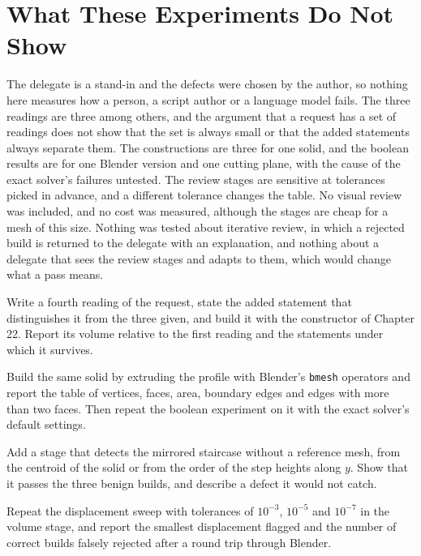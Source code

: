 \section{What These Experiments Do Not Show}

The delegate is a stand-in and the defects were chosen by the author, so nothing here measures how a person, a script author or a language model fails. The three readings are three among others, and the argument that a request has a set of readings does not show that the set is always small or that the added statements always separate them. The constructions are three for one solid, and the boolean results are for one Blender version and one cutting plane, with the cause of the exact solver's failures untested. The review stages are sensitive at tolerances picked in advance, and a different tolerance changes the table. No visual review was included, and no cost was measured, although the stages are cheap for a mesh of this size. Nothing was tested about iterative review, in which a rejected build is returned to the delegate with an explanation, and nothing about a delegate that sees the review stages and adapts to them, which would change what a pass means.

\begin{exercise}
Write a fourth reading of the request, state the added statement that distinguishes it from the three given, and build it with the constructor of Chapter 22. Report its volume relative to the first reading and the statements under which it survives.
\end{exercise}

\begin{exercise}
Build the same solid by extruding the profile with Blender's \texttt{bmesh} operators and report the table of vertices, faces, area, boundary edges and edges with more than two faces. Then repeat the boolean experiment on it with the exact solver's default settings.
\end{exercise}

\begin{exercise}
Add a stage that detects the mirrored staircase without a reference mesh, from the centroid of the solid or from the order of the step heights along $y$. Show that it passes the three benign builds, and describe a defect it would not catch.
\end{exercise}

\begin{exercise}
Repeat the displacement sweep with tolerances of $10^{-3}$, $10^{-5}$ and $10^{-7}$ in the volume stage, and report the smallest displacement flagged and the number of correct builds falsely rejected after a round trip through Blender.
\end{exercise}
